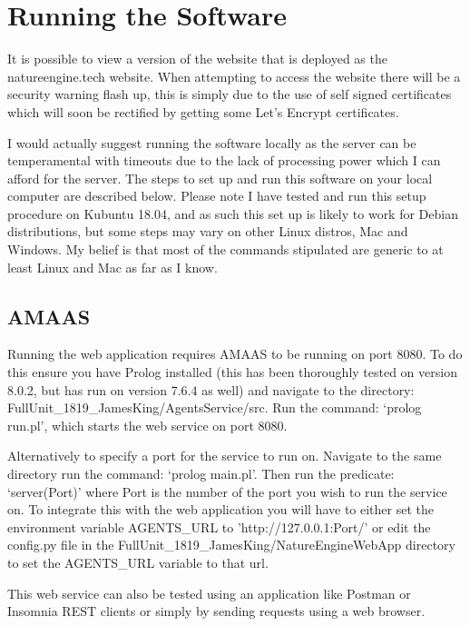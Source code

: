 \documentclass[]{final_report}
\begin{document}
\section{Running the Software}
\label{appendix:softrun}
It is possible to view a version of the website that is deployed as the natureengine.tech website. When attempting to access the website there will be a security warning flash up, this is simply due to the use of self signed certificates which will soon be rectified by getting some Let's Encrypt certificates.\par 
I would actually suggest running the software locally as the server can be temperamental with timeouts due to the lack of processing power which I can afford for the server. The steps to set up and run this software on your local computer are described below. Please note I have tested and run this setup procedure on Kubuntu 18.04, and as such this set up is likely to work for Debian distributions, but some steps may vary on other Linux distros, Mac and Windows. My belief is that most of the commands stipulated are generic to at least Linux and Mac as far as I know.

\subsection{AMAAS}
Running the web application requires AMAAS to be running on port 8080. To do this ensure you have Prolog installed (this has been thoroughly tested on version 8.0.2, but has run on version 7.6.4 as well) and navigate to the directory:\\ FullUnit\_1819\_JamesKing/AgentsService/src. Run the command: `prolog run.pl', which starts the web service on port 8080.\par 
Alternatively to specify a port for the service to run on. Navigate to the same directory run the command: `prolog main.pl'. Then run the predicate: `server(Port)' where Port is the number of the port you wish to run the service on. To integrate this with the web application you will have to either set the environment variable AGENTS\_URL to 'http://127.0.0.1:Port/' or edit the config.py file in the FullUnit\_1819\_JamesKing/NatureEngineWebApp directory to set the AGENTS\_URL variable to that url.\par 
This web service can also be tested using an application like Postman or Insomnia REST clients or simply by sending requests using a web browser. 
\end{document}
